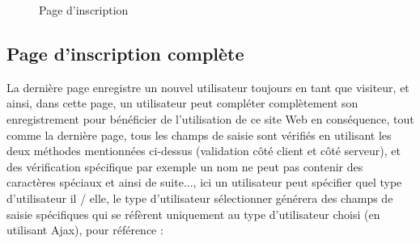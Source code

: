 \documentclass[12pt]{report}
\begin{document}
\vspace{0.5in}

\begin{figure}[h]
\centering
\caption{Page d'inscription}
\end{figure}

\newpage

\subsection{Page d'inscription complète}

La dernière page enregistre un nouvel utilisateur toujours en tant que visiteur, et ainsi, dans cette page, un utilisateur peut compléter complètement son enregistrement pour bénéficier de l'utilisation de ce site Web en conséquence, tout comme la dernière page, tous les champs de saisie sont vérifiés en utilisant les deux méthodes mentionnées ci-dessus (validation côté client et côté serveur), et des vérification spécifique par exemple un nom ne peut pas contenir des caractères spéciaux et ainsi de suite..., ici un utilisateur peut spécifier quel type d'utilisateur il / elle, le type d'utilisateur sélectionner générera des champs de saisie spécifiques qui se réfèrent uniquement au type d'utilisateur choisi (en utilisant Ajax), pour référence :
\end{document}
